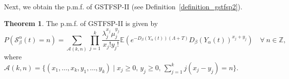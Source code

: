 \documentclass[11pt,oneside,reqno]{amsart}
\theoremstyle{definition}
\newtheorem{theorem}{\bf Theorem}[section]
\newtheorem{remark}{\bf Remark}[section]
\theoremstyle{remarkstyle}
\begin{document}
Next, we obtain the p.m.f. of GSTFSP-II (see Definition~\ref{definition_gstfsp2}).
\begin{theorem}\label{p.m.f..gstfsp2}
    The p.m.f. of GSTFSP-II is given by
    \begin{equation*}
        P(\mathcal{S}_{\beta}^{\alpha}(t)=n)=\sum_{\mathcal{A}(k,n)}\prod_{j=1}^{k}\frac{\lambda_j^{x_j}\mu_j^{y_j}}{x_j!y_j!}\mathbb{E}(e^{-D_\beta(Y_\alpha(t))(\Lambda+T)}D_\beta(Y_\alpha(t))^{x_j+y_j})\quad\forall~n\in \mathbb{Z},
    \end{equation*}
    where $\displaystyle\mathcal{A}(k,n)= \{(x_1,\dots,x_k,y_1,\dots,y_k)\mid x_j\ge 0,\,y_j\ge 0,\,\sum_{j=1}^{k}j(x_j-y_j)=n\}$.
\end{theorem}
\end{document}

